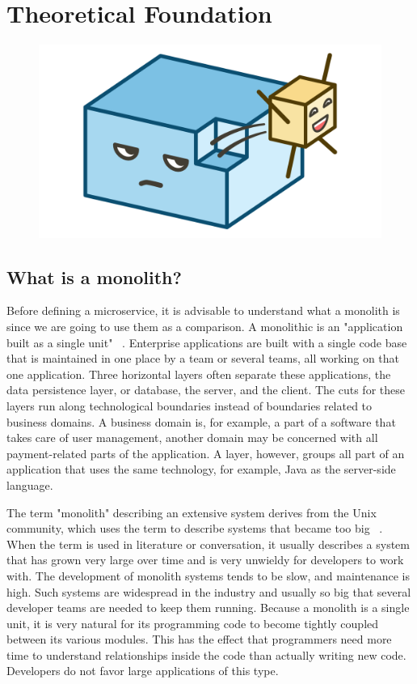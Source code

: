 \chapter{Theoretical Foundation}
\label{sec:theory}


\begin{figure}[ht]
  \centering
  \includegraphics[width=0.4\linewidth]{assets/illustration-monolith-microservice.png}
  \label{fig:illustration-monolith-microservice}
\end{figure}


\section{What is a monolith?}

Before defining a microservice, it is advisable to understand what a monolith is since we are going to use them as a comparison. A monolithic is an "application built as a single unit" ~\cite{microservices.2014}. Enterprise applications are built with a single code base that is maintained in one place by a team or several teams, all working on that one application. Three horizontal layers often separate these applications, the data persistence layer, or database, the server, and the client. The cuts for these layers run along technological boundaries instead of boundaries related to business domains. A business domain is, for example, a part of a software that takes care of user management, another domain may be concerned with all payment-related parts of the application. A layer, however, groups all part of an application that uses the same technology, for example, Java as the server-side language.

The term "monolith" describing an extensive system derives from the Unix community, which uses the term to describe systems that became too big ~\cite{raymond.2003}. When the term is used in literature or conversation, it usually describes a system that has grown very large over time and is very unwieldy for developers to work with. The development of monolith systems tends to be slow, and maintenance is high. Such systems are widespread in the industry and usually so big that several developer teams are needed to keep them running. Because a monolith is a single unit, it is very natural for its programming code to become tightly coupled between its various modules. This has the effect that programmers need more time to understand relationships inside the code than actually writing new code. Developers do not favor large applications of this type.



